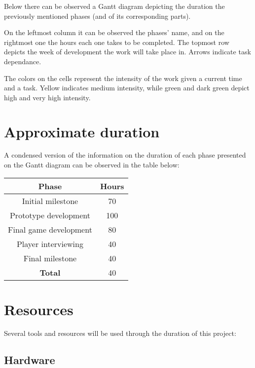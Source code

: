 Below there can be observed a Gantt diagram depicting the duration the previously mentioned phases (and of its corresponding parts).

On the leftmost column it can be observed the phases' name, and on the rightmost one the hours each one takes to be completed. The topmost row depicts the week of development the work will take place in. Arrows indicate task dependance.

The colors on the cells represent the intensity of the work given a current time and a task. Yellow indicates medium intensity, while green and dark green depict high and very high intensity.


\section{Approximate duration}

A condensed version of the information on the duration of each phase presented on the Gantt diagram can be observed in the table below:

\begin{center}
    \begin{tabular}{ |c|c| } 
        \hline
        \textbf{Phase} & \textbf{Hours} \\
        \hline
        \hline
        Initial milestone & 70 \\ 
        \hline
        Prototype development & 100 \\ 
        \hline
        Final game development & 80 \\ 
        \hline
        Player interviewing & 40 \\ 
        \hline
        Final milestone & 40 \\ 
        \hline
        \hline
        \textbf{Total} & 40 \\ 
        \hline
    \end{tabular}
\end{center}

\section{Resources}

Several tools and resources will be used through the duration of this project:

\subsection{Hardware}

